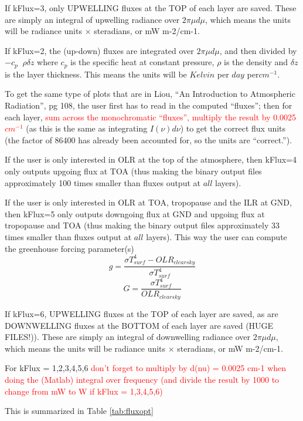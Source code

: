 \documentclass[12pt]{article}
\begin{document}
If kFlux=3, only UPWELLING fluxes at the TOP of each layer are saved. These
are simply an integral of upwelling radiance over $2 \pi \mu d\mu$, which means the units will 
be radiance units $\times$ steradians, or mW m-2/cm-1. 

If kFlux=2, the (up-down) fluxes are integrated over $2\pi \mu d\mu$, and 
then divided by $-c_{p} \;\; \rho \delta z$ where $c_{p}$ is the specific heat
at constant pressure, $\rho$ is the density and $\delta z$ is the layer 
thickness. This means the units will be $Kelvin$ per $day$ per$cm^{-1}$. 

To get the same type of plots that are in Liou, ``An Introduction to 
Atmospheric Radiation'', pg 108, the user first has to read in the computed 
``fluxes''; then for each layer, 
\textcolor{red}{sum across the monochromatic ``fluxes'', multiply the result 
by 0.0025 $cm^{-1}$} (as this is the same as integrating $I(\nu) d\nu$) to 
get the correct flux units (the factor of 86400 has already been accounted 
for, so the units are ``correct.''). 

If the user is only interested in OLR at the top of the atmosphere, 
then kFlux=4 only outputs upgoing flux at TOA (thus making the binary output 
files approximately 100 times smaller than fluxes output at $all$ layers).

If the user is only interested in OLR at TOA, tropopause and the ILR at GND, 
then kFlux=5 only outputs downgoing flux at GND and upgoing flux at 
tropopause and TOA (thus making the binary output files approximately 33 times
smaller than fluxes output at $all$ layers). This way the user can compute the
greenhouse forcing parameter(s) \cite{fre:96,sod:95}
\[
g = \frac{\sigma T_{surf}^4 - OLR_{clearsky}}{\sigma T_{surf}^4}
\]
\[
G = \frac{\sigma T_{surf}^4}{OLR_{clearsky}}
\]

If kFlux=6, UPWELLING fluxes at the TOP of each layer are saved, as are 
DOWNWELLING fluxes at the BOTTOM of each layer are saved (HUGE FILES!)). These
are simply an integral of downwelling radiance over $2 \pi \mu d\mu$, which means the units will 
be radiance units $\times$ steradians, or mW m-2/cm-1. 

For kFlux = 1,2,3,4,5,6
\textcolor{red}{don't forget to multiply by d(nu) = 0.0025 cm-1 
                when doing the (Matlab) integral over frequency (and divide 
                the result by 1000 to change from mW to W if kFlux = 1,3,4,5,6)}


This is summarized in Table \ref{tab:fluxopt}
\end{document}
